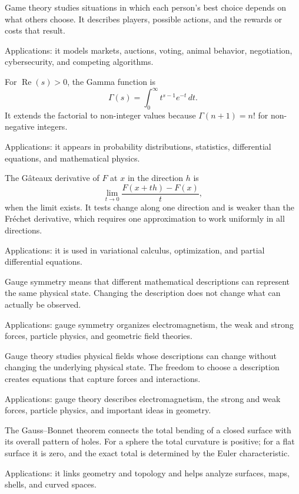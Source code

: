 Game theory studies situations in which each person's best choice depends on what others choose. It describes players, possible actions, and the rewards or costs that result. \par\noindent Applications: it models markets, auctions, voting, animal behavior, negotiation, cybersecurity, and competing algorithms.

For $\operatorname{Re}(s)>0$, the Gamma function is
\[
\Gamma(s)=\int_0^\infty t^{s-1}e^{-t}\,dt.
\]
It extends the factorial to non-integer values because $\Gamma(n+1)=n!$ for non-negative integers. \par\noindent Applications: it appears in probability distributions, statistics, differential equations, and mathematical physics.

The Gâteaux derivative of $F$ at $x$ in the direction $h$ is
\[
\lim_{t\to 0}\frac{F(x+th)-F(x)}{t},
\]
when the limit exists. It tests change along one direction and is weaker than the Fréchet derivative, which requires one approximation to work uniformly in all directions. \par\noindent Applications: it is used in variational calculus, optimization, and partial differential equations.

Gauge symmetry means that different mathematical descriptions can represent the same physical state. Changing the description does not change what can actually be observed. \par\noindent Applications: gauge symmetry organizes electromagnetism, the weak and strong forces, particle physics, and geometric field theories.

Gauge theory studies physical fields whose descriptions can change without changing the underlying physical state. The freedom to choose a description creates equations that capture forces and interactions. \par\noindent Applications: gauge theory describes electromagnetism, the strong and weak forces, particle physics, and important ideas in geometry.

The Gauss--Bonnet theorem connects the total bending of a closed surface with its overall pattern of holes. For a sphere the total curvature is positive; for a flat surface it is zero, and the exact total is determined by the Euler characteristic. \par\noindent Applications: it links geometry and topology and helps analyze surfaces, maps, shells, and curved spaces.

